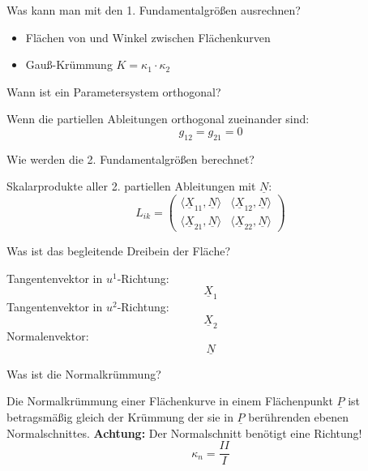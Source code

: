 \documentclass[twocolumn, fontsize=8pt, DIV=1]{scrartcl}
\begin{document}
\begin{framed}
    Was kann man mit den 1. Fundamentalgrößen ausrechnen?
\end{framed}
\begin{itemize}
    \item Flächen von und Winkel zwischen Flächenkurven
    \item Gauß-Krümmung $K = \kappa_1 \cdot \kappa_2$
\end{itemize}



\begin{framed}
    Wann ist ein Parametersystem orthogonal?
\end{framed}
Wenn die partiellen Ableitungen orthogonal zueinander sind:
\[
    g_{12} = g_{21} = 0
\]



\begin{framed}
    Wie werden die 2. Fundamentalgrößen berechnet?
\end{framed}
Skalarprodukte aller 2. partiellen Ableitungen mit $\underline{N}$:
\[
    L_{ik} =
        \left(
            \begin{array}{rr}
                \langle \underline{X}_{11}, \underline{N} \rangle & \langle \underline{X}_{12}, \underline{N} \rangle \\
                \langle \underline{X}_{21}, \underline{N} \rangle & \langle \underline{X}_{22}, \underline{N} \rangle
            \end{array}
        \right)
\]



\begin{framed}
    Was ist das begleitende Dreibein der Fläche?
\end{framed}
Tangentenvektor in $u^1$-Richtung:
\[
    \underline{X}_1
\]
Tangentenvektor in $u^2$-Richtung:
\[
    \underline{X}_2
\]
Normalenvektor:
\[
    \underline{N}
\]



\begin{framed}
    Was ist die Normalkrümmung?
\end{framed}
Die Normalkrümmung einer Flächenkurve in einem Flächenpunkt $\underline{P}$ ist betragsmäßig gleich der Krümmung der sie in $\underline{P}$ berührenden ebenen Normalschnittes. \textbf{Achtung:} Der Normalschnitt benötigt eine Richtung!
\[
    \kappa_n = \frac{II}{I}
\]
\end{document}

